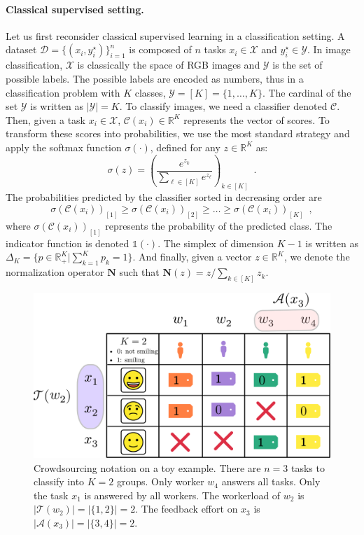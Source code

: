 \paragraph*{Classical supervised setting.}Let us first reconsider classical supervised learning in a classification setting.
A dataset $\mathcal{D}=\{(x_i, y_i^\star)\}_{i=1}^n$ is composed of $n$ tasks $x_i\in\mathcal{X}$ and $y_i^\star\in\mathcal{Y}$.
In image classification, $\mathcal{X}$ is classically the space of RGB images and $\mathcal{Y}$ is the set of possible labels.
The possible labels are encoded as numbers, thus in a classification problem with $K$ classes, $\mathcal{Y}=[K]=\{1,\dots,K\}$.
The cardinal of the set $\mathcal{Y}$ is written as $|\mathcal{Y}|=K$.
To classify images, we need a classifier denoted $\mathcal{C}$.
Then, given a task $x_i\in\mathcal{X}$, $\mathcal{C}(x_i)\in\mathbb{R}^K$ represents the vector of scores.
To transform these scores into probabilities, we use the most standard strategy and apply the softmax function $\sigma(\cdot)$, defined for any $z\in\mathbb{R}^K$ as:
$$
\sigma(z) = \left(\frac{e^{z_k}}{\sum_{\ell\in [K]} e^{z_\ell}}\right)_{k\in [K]} \enspace.
$$
The probabilities predicted by the classifier sorted in decreasing order are
$$
\sigma(\mathcal{C}(x_i))_{[1]} \geq \sigma(\mathcal{C}(x_i))_{[2]}\geq \dots\geq \sigma(\mathcal{C}(x_i))_{[K]} \enspace,
$$
where $\sigma(\mathcal{C}(x_i))_{[1]}$ represents the probability of the predicted class.
The indicator function is denoted $\mathds{1}(\cdot)$. The simplex of dimension $K-1$ is written as $\Delta_K=\{p \in\mathbb{R}^K_+ | \sum_{k=1}^K p_k = 1\}$.
And finally, given a vector $z\in\mathbb{R}^K$, we denote the normalization operator $\mathbf{N}$ such that $\mathbf{N}(z) = z / \sum_{k\in[K]}z_k$.

\begin{figure}[thb]
    \centering
    \includegraphics[width=.7\textwidth]{chapters/images/notations.pdf}
    \caption{Crowdsourcing notation on a toy example. There are $n=3$ tasks to classify into $K=2$ groups. Only worker $w_4$ answers all tasks. Only the task $x_1$ is answered by all workers. The workerload of $w_2$ is $|\mathcal{T}(w_2)|=|\{1,2\}|=2$. The feedback effort on $x_3$ is $|\mathcal{A}(x_3)|=|\{3,4\}|=2$.}
    \label{fig:enter-label}
\end{figure}

